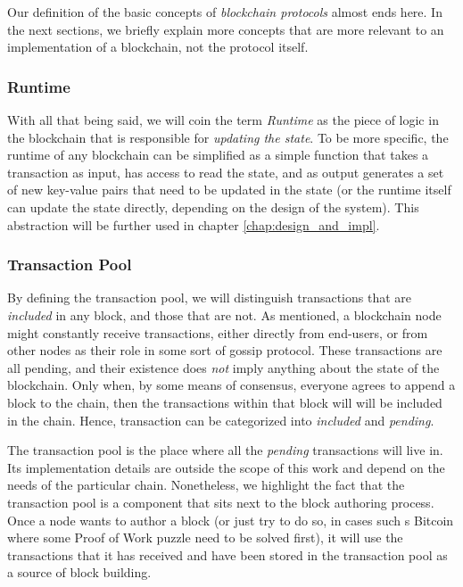 Our definition of the basic concepts of \textit{blockchain protocols} almost ends here. In the next
sections, we briefly explain more concepts that are more relevant to an implementation of a
blockchain, not the protocol itself.

\subsubsection{Runtime} \label{chap_bg:subsec:runtime}

With all that being said, we will coin the term \textit{Runtime} as the piece of logic in the
blockchain that is responsible for \textit{updating the state}. To be more specific, the runtime of
any blockchain can be simplified as a simple function that takes a transaction as input, has access
to read the state, and as output generates a set of new key-value pairs that need to be updated in
the state (or the runtime itself can update the state directly, depending on the design of the
system). This abstraction will be further used in chapter \ref{chap:design_and_impl}.

\subsubsection{Transaction Pool} \label{chap_bg:subsec:tx_pool}

By defining the transaction pool, we will distinguish transactions that are \textit{included} in
any block, and those that are not. As mentioned, a blockchain node might constantly receive
transactions, either directly from end-users, or from other nodes as their role in some sort of
gossip protocol. These transactions are all pending, and their existence does \textit{not} imply
anything about the state of the blockchain. Only when, by some means of consensus, everyone agrees
to append a block to the chain, then the transactions within that block will will be included in the
chain. Hence, transaction can be categorized into \textit{included} and \textit{pending}.

The transaction pool is the place where all the \textit{pending} transactions will live in. Its
implementation details are outside the scope of this work and depend on the needs of the particular
chain. Nonetheless, we highlight the fact that the transaction pool is a component that sits next to
the block authoring process. Once a node wants to author a block (or just try to do so, in cases
such s Bitcoin where some Proof of Work puzzle need to be solved first), it will use the
transactions that it has received and have been stored in the transaction pool as a source of block
building.

